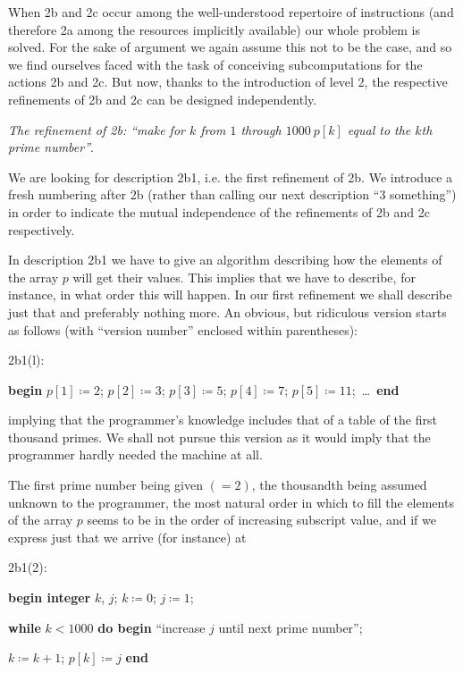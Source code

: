 \documentclass[twoside,11pt]{book}
\begin{document}
When 2b and 2c occur among the well-understood repertoire of instructions (and therefore 2a among the resources implicitly available) our whole problem is solved. For the sake of argument we again assume this not to be the case, and so we find ourselves faced with the task of conceiving subcomputations for the actions 2b and 2c. But now, thanks to the introduction of level 2, the respective refinements of 2b and 2c can be designed independently.

\emph{The refinement of 2b: ``make for $k$ from $1$ through $1000\ p[k]$ equal to the $k$\emph{th} prime number''}.

We are looking for description 2b1, i.e. the first refinement of 2b. We introduce a fresh numbering after 2b (rather than calling our next description ``3 something'') in order to indicate the mutual independence of the refinements of 2b and 2c respectively.

In description 2b1 we have to give an algorithm describing how the elements of the array $p$ will get their values. This implies that we have to describe, for instance, in what order this will happen. In our first refinement we shall describe just that and preferably nothing more. An obvious, but ridiculous version starts as follows (with ``version number'' enclosed within parentheses):

\noindent
2b1(l):
\nopagebreak

\noindent
\textbf{begin} $p[1] \coloneq 2$; $p[2] \coloneq 3$; $p[3] \coloneq 5$; $p[4] \coloneq 7$; $p[5] \coloneq 11$;\ \dots\ \textbf{end}

\noindent
implying that the programmer's knowledge includes that of a table of the first thousand primes. We shall not pursue this version as it would imply that the programmer hardly needed the machine at all.

The first prime number being given $(=2)$, the thousandth being assumed unknown to the programmer, the most natural order in which to fill the elements of the array $p$ seems to be in the order of increasing subscript value, and if we express just that we arrive (for instance) at

\noindent
2b1(2):

\noindent
\textbf{begin integer} $k$, $j$; $k \coloneq 0$; $j \coloneq 1$;

\noindent
\quad \textbf{while} $k < 1000$ \textbf{do begin} ``increase $j$ until next prime number'';

\noindent
\quad\quad $k \coloneq k + 1$; $p[k] \coloneq j$ \textbf{end}
\end{document}
